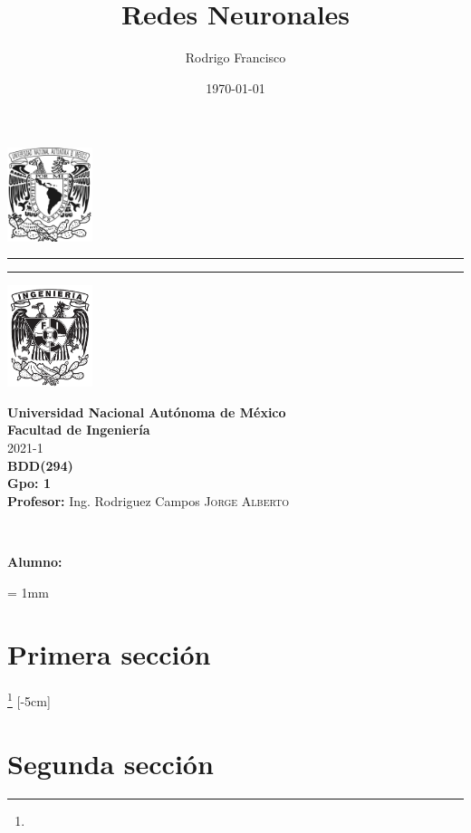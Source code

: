 \documentclass[a4paper,12pt]{article}
\author{Rodrigo Francisco} \let\authorref\@author
\title{Redes Neuronales} \let\titleref\@title
\date{\today} \let\dateref\@date
\newcommand{\coverpage}{
  \thispagestyle{empty}
  \begin{minipage}[t][5cm][t]{0.2\linewidth}
    \centering
    \includegraphics[width=2.5cm]{unam-negro}
    \newline \newline
    \vspace{8mm}
    \rule{2pt}{0.6\textheight}
    \rule{2pt}{0.6\textheight}
    \newline
    \includegraphics[width=2.5cm]{fi-negro}
  \end{minipage}
  \begin{minipage}[t]{0.7\linewidth}
    \vspace{-2.5cm}
    \LARGE{\textbf{\university}}\\
    \Large{\textbf{\faculty}} \\
  
    \large{\semestre}\\[2cm]
  
    \large{\textbf{\materia (\clave)}}\\
    \large{\textbf{Gpo: \grupo}}\\[5mm]
    \large{\textbf{Profesor:} \profesor}\\ [1.5cm]
    \begin{center}
        \LARGE{\textbf{\titleref}}\\
    \end{center}
  
    \vspace{3.3cm}
  
    \large{\textbf{Alumno:} \authorref} \\[1.5cm]
  
    \begin{flushright}
        \dateref
    \end{flushright}
  \end{minipage}
  \newpage
}
\newcommand{\university}{Universidad Nacional Autónoma de México}
\newcommand{\faculty}{Facultad de Ingeniería}
\newcommand{\semestre}{2021-1}
\newcommand{\materia}{BDD}
\newcommand{\clave}{294}
\newcommand{\grupo}{1}
\newcommand{\profesor}{Ing. Rodriguez Campos \textsc{Jorge Alberto}}
\begin{document}
  \coverpage%
  {
  \parskip = 1mm
  \tableofcontents
  }
  \begin{multicols}{2}
    \section{Primera sección}
    \lipsum\footnote{\lipsum[1][2]}
    [-5cm]
    \section{Segunda sección}
    \lipsum[1-4]
  \end{multicols}
\end{document}
